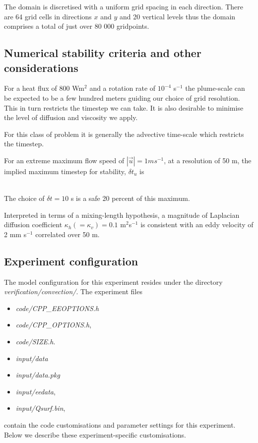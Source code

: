 The domain is discretised with a uniform grid spacing in each direction. There are 64
grid cells in directions $x$ and $y$ and 20 vertical levels thus the domain
comprises a total of just over 80 000 gridpoints.

\subsection{Numerical stability criteria and other considerations}

For a heat flux of 800 Wm$^2$ and a rotation rate of $10^{-4}$ s$^{-1}$ the
plume-scale can be expected to be a few hundred meters guiding our choice of grid
resolution. This in turn restricts the timestep we can take. It is also desirable to 
minimise the level of diffusion and viscosity we apply.

For this class of problem it is generally the advective time-scale which restricts 
the timestep. 

For an extreme maximum flow speed of $ | \vec{u} | = 1 ms^{-1}$, at a resolution of
50 m, the implied maximum timestep for stability, $\delta t_u$ is 

\begin{eqnarray}
\label{eq:eg-bconv-advectiveCFLcondition}
\end{eqnarray}

The choice of $\delta t = 10$ s is a safe 20 percent of this maximum.
 
Interpreted in terms of a mixing-length hypothesis, a magnitude of Laplacian
diffusion coefficient $\kappa_h (=
\kappa_v) = 0.1$ m$^2$s$^{-1}$ is consistent with an eddy velocity of 2 mm s$^{-1}$
correlated over 50 m.  

\subsection{Experiment configuration}

The model configuration for this experiment resides under the directory
{\it verification/convection/}. The experiment files
\begin{itemize}
\item {\it code/CPP\_EEOPTIONS.h}
\item {\it code/CPP\_OPTIONS.h},
\item {\it code/SIZE.h}. 
\item {\it input/data}
\item {\it input/data.pkg}
\item {\it input/eedata},
\item {\it input/Qsurf.bin},
\end{itemize}
contain the code customisations and parameter settings for this 
experiment. Below we describe these experiment-specific customisations.


